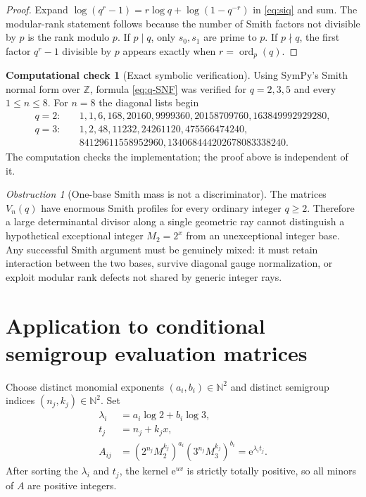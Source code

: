 \documentclass[11pt,oneside]{article}
\theoremstyle{definition}
\newtheorem{experiment}[theorem]{Computational check}
\theoremstyle{remark}
\newtheorem{obstruction}[theorem]{Obstruction}
\newcommand{\Mtwo}{M_2}
\newcommand{\Mthree}{M_3}
\newcommand{\Z}{\mathbb{Z}}
\newcommand{\N}{\mathbb{N}}
\newcommand{\ord}{\operatorname{ord}}
\newcommand{\e}{\mathrm{e}}
\begin{document}
\begin{proof}
Expand $\log(q^r-1)=r\log q+\log(1-q^{-r})$ in \eqref{eq:siq} and sum.  The modular-rank statement follows because the number of Smith factors not divisible by $p$ is the rank modulo $p$.  If $p\mid q$, only $s_0,s_1$ are prime to $p$.  If $p\nmid q$, the first factor $q^r-1$ divisible by $p$ appears exactly when $r=\ord_p(q)$.
\end{proof}

\begin{experiment}[Exact symbolic verification]
Using SymPy's Smith normal form over $\Z$, formula \eqref{eq:q-SNF} was verified for $q=2,3,5$ and every $1\le n\le8$.  For $n=8$ the diagonal lists begin
\begin{align*}
q=2:\quad&1,1,6,168,20160,9999360,20158709760,163849992929280,\\
q=3:\quad&1,2,48,11232,24261120,475566474240,\\
&84129611558952960,134068444202678083338240.
\end{align*}
The computation checks the implementation; the proof above is independent of it.
\end{experiment}

\begin{obstruction}[One-base Smith mass is not a discriminator]
The matrices $V_n(q)$ have enormous Smith profiles for every ordinary integer $q\ge2$.  Therefore a large determinantal divisor along a single geometric ray cannot distinguish a hypothetical exceptional integer $\Mtwo=2^x$ from an unexceptional integer base.  Any successful Smith argument must be genuinely mixed: it must retain interaction between the two bases, survive diagonal gauge normalization, or exploit modular rank defects not shared by generic integer rays.
\end{obstruction}

\section{Application to conditional semigroup evaluation matrices}
\label{sec:semigroup-matrix}

Choose distinct monomial exponents $(a_i,b_i)\in\N^2$ and distinct semigroup indices $(n_j,k_j)\in\N^2$.  Set
\begin{align}
 \lambda_i&=a_i\log2+b_i\log3,\\
 t_j&=n_j+k_jx,\\
 A_{ij}&=(2^{n_j}\Mtwo^{k_j})^{a_i}(3^{n_j}\Mthree^{k_j})^{b_i}
       =\e^{\lambda_i t_j}.
 \label{eq:semigroup-A}
\end{align}
After sorting the $\lambda_i$ and $t_j$, the kernel $\e^{uv}$ is strictly totally positive, so all minors of $A$ are positive integers.
\end{document}
